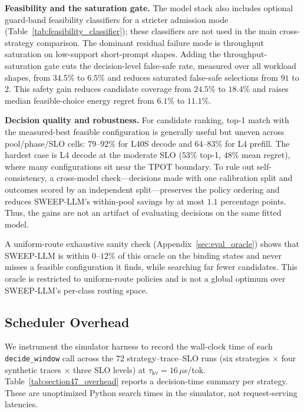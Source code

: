 \textbf{Feasibility and the saturation gate.}
The model stack also includes optional guard-band feasibility classifiers for a stricter admission mode (Table~\ref{tab:feasibility_classifier}); these classifiers are not used in the main cross-strategy comparison.
The dominant residual failure mode is throughput saturation on low-support short-prompt shapes.
Adding the throughput-saturation gate cuts the decision-level false-safe rate, measured over all workload shapes, from $34.5\%$ to $6.5\%$ and reduces saturated false-safe selections from $91$ to $2$.
This safety gain reduces candidate coverage from $24.5\%$ to $18.4\%$ and raises median feasible-choice energy regret from $6.1\%$ to $11.1\%$.

\textbf{Decision quality and robustness.}
For candidate ranking, top-1 match with the measured-best feasible configuration is generally useful but uneven across pool/phase/SLO cells: $79$--$92\%$ for L40S decode and $64$--$83\%$ for L4 prefill.
The hardest case is L4 decode at the moderate SLO ($53\%$ top-1, $48\%$ mean regret), where many configurations sit near the TPOT boundary.
To rule out self-consistency, a cross-model check---decisions made with one calibration split and outcomes scored by an independent split---preserves the policy ordering and reduces SWEEP-LLM's within-pool savings by at most $1.1$ percentage points.
Thus, the gains are not an artifact of evaluating decisions on the same fitted model.

A uniform-route exhaustive sanity check (Appendix~\ref{sec:eval_oracle}) shows that SWEEP-LLM is within $0$--$12\%$ of this oracle on the binding states and never misses a feasible configuration it finds, while searching far fewer candidates.
This oracle is restricted to uniform-route policies and is not a global optimum over SWEEP-LLM's per-class routing space.



\subsection{Scheduler Overhead}
\label{sec:eval_overhead}

We instrument the simulator harness to record the wall-clock time of each \texttt{decide\_window} call across the $72$ strategy--trace--SLO runs (six strategies $\times$ four synthetic traces $\times$ three SLO levels) at $\tau_{\mathrm{kv}}{=}16$\,$\mu$s/tok.
Table~\ref{tab:section47_overhead} reports a decision-time summary per strategy.
These are unoptimized Python search times in the simulator, not request-serving latencies.

